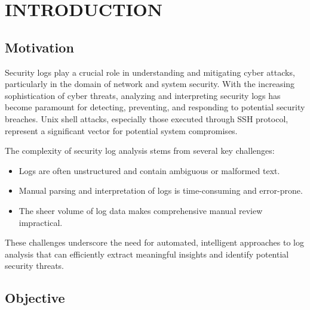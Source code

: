 

\vspace{-1cm}

\section{INTRODUCTION}


    \subsection{Motivation}

        Security logs play a crucial role in understanding and mitigating cyber attacks, particularly in the domain of network and system security. With the increasing sophistication of cyber threats, analyzing and interpreting security logs has become paramount for detecting, preventing, and responding to potential security breaches. Unix shell attacks, especially those executed through SSH protocol, represent a significant vector for potential system compromises.

        The complexity of security log analysis stems from several key challenges:
        
        \begin{itemize}
            \item Logs are often unstructured and contain ambiguous or malformed text.
            \item Manual parsing and interpretation of logs is time-consuming and error-prone.
            \item The sheer volume of log data makes comprehensive manual review impractical.
        \end{itemize}

        These challenges underscore the need for automated, intelligent approaches to log analysis that can efficiently extract meaningful insights and identify potential security threats.

    \subsection{Objective}

